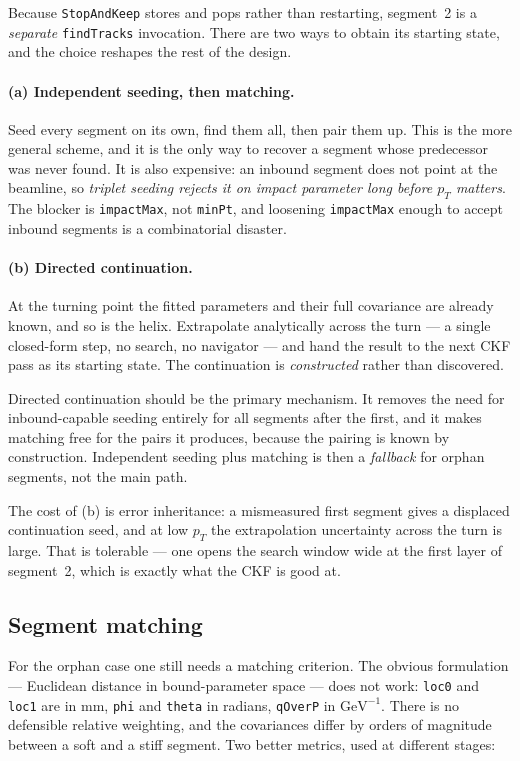 \documentclass[11pt,a4paper]{article}
\newcommand{\code}[1]{\texttt{\small #1}}
\begin{document}
Because \code{StopAndKeep} stores and pops rather than restarting, segment~2 is
a \emph{separate} \code{findTracks} invocation. There are two ways to obtain its
starting state, and the choice reshapes the rest of the design.

\paragraph{(a) Independent seeding, then matching.} Seed every segment on its
own, find them all, then pair them up. This is the more general scheme, and it
is the only way to recover a segment whose predecessor was never found. It is
also expensive: an inbound segment does not point at the beamline, so
\emph{triplet seeding rejects it on impact parameter long before $p_T$ matters}.
The blocker is \code{impactMax}, not \code{minPt}, and loosening \code{impactMax}
enough to accept inbound segments is a combinatorial disaster.

\paragraph{(b) Directed continuation.} At the turning point the fitted
parameters and their full covariance are already known, and so is the helix.
Extrapolate analytically across the turn --- a single closed-form step, no
search, no navigator --- and hand the result to the next CKF pass as its
starting state. The continuation is \emph{constructed} rather than discovered.

\medskip\noindent
Directed continuation should be the primary mechanism. It removes the need for
inbound-capable seeding entirely for all segments after the first, and it makes
matching free for the pairs it produces, because the pairing is known by
construction. Independent seeding plus matching is then a \emph{fallback} for
orphan segments, not the main path.

The cost of (b) is error inheritance: a mismeasured first segment gives a
displaced continuation seed, and at low $p_T$ the extrapolation uncertainty
across the turn is large. That is tolerable --- one opens the search window wide
at the first layer of segment~2, which is exactly what the CKF is good at.

\subsection{Segment matching}
\label{sec:matching}

For the orphan case one still needs a matching criterion. The obvious
formulation --- Euclidean distance in bound-parameter space --- does not work:
\code{loc0} and \code{loc1} are in mm, \code{phi} and \code{theta} in radians,
\code{qOverP} in $\mathrm{GeV}^{-1}$. There is no defensible relative weighting,
and the covariances differ by orders of magnitude between a soft and a stiff
segment. Two better metrics, used at different stages:
\end{document}
